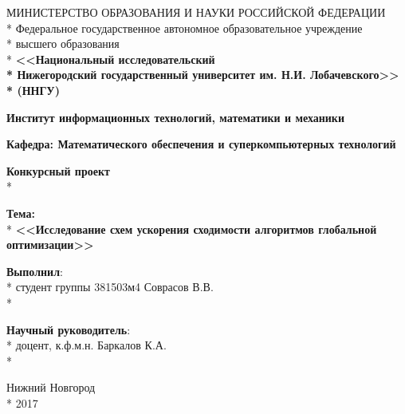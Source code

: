\begin{titlepage}

\begin{center}
МИНИСТЕРСТВО ОБРАЗОВАНИЯ И НАУКИ РОССИЙСКОЙ ФЕДЕРАЦИИ \\*
Федеральное   государственное  автономное  образовательное  учреждение \\*
высшего образования \\*
\textbf{<<Национальный исследовательский \\*
Нижегородский государственный университет им. Н.И. Лобачевского>> \\*
(ННГУ)}
\end{center}

\vspace{12pt}

\begin{center}
\textbf{Институт информационных технологий, математики и механики}
\end{center}

\begin{center}
\textbf{Кафедра: Математического обеспечения и суперкомпьютерных технологий}
\end{center}

\vspace{45pt}
\vspace{30pt}

\begin{center}
\fontsize{18pt}{0pt}\textbf{Конкурсный проект} \\*

\end{center}
\begin{center}
\textbf{Тема:} \\*
\fontsize{16pt}{0pt}\textbf{<<Исследование схем ускорения сходимости алгоритмов глобальной оптимизации>>}
\end{center}

\vspace{53pt}

\begin{flushright}
\textbf{Выполнил}: \\*
студент группы 381503м4 Соврасов В.В. \\*

\textbf{Научный руководитель}:  \\*
доцент, к.ф.м.н. Баркалов К.А. \\*
\end{flushright}

\vspace{\fill}

\begin{center}
Нижний Новгород \\*
2017
\end{center}

\end{titlepage}
